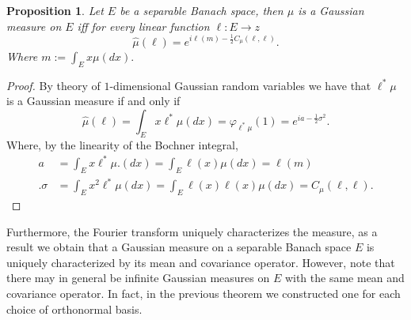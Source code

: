 \documentclass[12pt]{article}
\newcommand{\R}zzzzz
\newtheorem{proposition}{Proposition}
\begin{document}
\begin{proposition}
	Let $E$ be a separable Banach space, then $\mu $ is a Gaussian measure on $E$ iff for every linear function  $\ell :E\to\R$
	\begin{equation*}
		\hat{\mu }(\ell )=e^{i\ell(m)-\frac{1}{2}C_\mu (\ell ,\ell )}.
	\end{equation*}
	Where
	$		m:=\int_{E}x \mu (dx).
	$
\end{proposition}
\begin{proof}
	By theory of $1$-dimensional Gaussian random variables we have that  $\ell ^*\mu $
	is a Gaussian measure if and only if
	\begin{equation*}
		\hat{\mu }(\ell )=\int_{E}x \ell^*\mu (dx)=\varphi_{\ell^*\mu}(1)=e^{ia -\frac{1}{2}\sigma^2} .
	\end{equation*}
	Where, by the linearity of the Bochner integral,
	\begin{align*}
		a      & =\int_{E}x \ell ^*\mu.  (dx)=\int_{E}\ell(x)\mu(dx)=\ell(m)                      \\ .
		\sigma & =\int_{E}x^2 \ell ^*\mu  (dx)=\int_{E}\ell(x)\ell (x)\mu(dx)=C_\mu (\ell ,\ell).
	\end{align*}
\end{proof}
Furthermore, the Fourier transform uniquely characterizes the measure, as a result we obtain that a Gaussian measure on  a separable Banach space $E$ is uniquely characterized by its mean and covariance operator. However, note that  there may in general be infinite Gaussian measures on $E$ with the same mean and covariance operator. In fact, in the previous theorem we constructed one for each choice of orthonormal basis.
\end{document}
